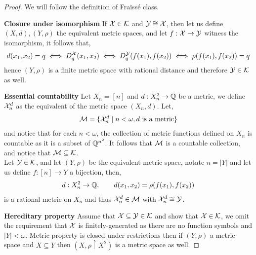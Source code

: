 \begin{proof}
	We will follow the definition of Fraïssé class.

	\textbf{Closure under isomorphism}\quad
	If $\mathcal{X} \in \mathcal{K}$ and $\mathcal{Y} \cong \mathcal{X}$, then let us define $(X, d), (Y, \rho)$ the equivalent metric spaces, and let $f : \mathcal{X} \to \mathcal{Y}$ witness the isomorphism, it follows that,
	\[
		d(x_1, x_2) = q
		\iff D_q^{\mathcal{X}}(x_1, x_2)
		\iff D_q^{\mathcal{Y}}(f(x_1), f(x_2))
		\iff \rho(f(x_1), f(x_2)) = q
	\]
	hence $(Y, \rho)$ is a finite metric space with rational distance and therefore $\mathcal{Y} \in \mathcal{K}$ as well.

	\textbf{Essential countability}\quad
	Let $X_n = [n]$ and $d : X_n^2 \to \mathbb{Q}$ be a metric, we define $\mathcal{X}_n^d$ as the equivalent of the metric space $(X_n, d)$.
	Let,
	\[
		\mathcal{M}
		= \{ \mathcal{X}_n^d \mid n < \omega, d \text{ is a metric} \}
	\]
	and notice that for each $n < \omega$, the collection of metric functions defined on $X_n$ is countable as it is a subset of $\mathbb{Q}^{n^2}$.
	It follows that $\mathcal{M}$ is a countable collection, and notice that $\mathcal{M} \subseteq \mathcal{K}$. \\
	Let $\mathcal{Y} \in \mathcal{K}$, and let $(Y, \rho)$ be the equivalent metric space, notate $n = |Y|$ and let us define $f : [n] \to Y$ a bijection, then,
	\[
		d : X_n^2 \to \mathbb{Q},
		\qquad
		d(x_1, x_2)
		= \rho(f(x_1), f(x_2))
	\]
	is a rational metric on $X_n$ and thus $\mathcal{X}_n^d \in \mathcal{M}$ with $\mathcal{X}_n^d \cong \mathcal{Y}$.

	\textbf{Hereditary property}\quad
	Assume that $\mathcal{X} \subseteq \mathcal{Y} \in \mathcal{K}$ and show that $\mathcal{X} \in \mathcal{K}$, we omit the requirement that $\mathcal{X}$ is finitely-generated as there are no function symbols and $|Y| < \omega$.
	Metric property is closed under restrictions then if $(Y, \rho)$ a metric space and $X \subseteq Y$ then $(X, \rho \restriction X^2)$ is a metric space as well.


\end{proof}
